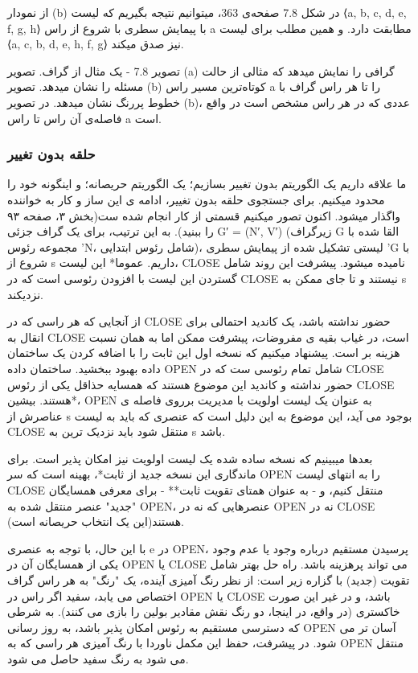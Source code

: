 \documentclass{book} %
\begin{document}
از نمودار (b) در شکل 7.8 صفحه‌ی 363، میتوانیم نتیجه بگیریم که لیست ⟨a, b, c, d, e, f, g, h⟩ با پیمایش سطری با شروع از راس a مطابقت دارد. و همین مطلب برای لیست ⟨a, c, b, d, e, h, f, g⟩ نیز صدق میکند.

تصویر 7.8 - یک مثال از گراف. تصویر (a) گرافی را نمایش میدهد که مثالی از حالت مسئله را نشان میدهد.  تصویر (b) کوتاه‌ترین مسیر راس a را تا هر راس گراف با خطوط پررنگ نشان میدهد. در تصویر (b)، عددی که در هر راس مشخص است در واقع فاصله‌ی آن راس تا راس a است.

\newpage
\subsubsection*{حلقه بدون تغییر}

ما علاقه داریم یک الگوریتم بدون تغییر بسازیم؛ یک الگوریتم حریصانه؛ و اینگونه خود را محدود میکنیم. برای جستجوی حلقه بدون تغییر، ادامه ی این ساز و کار به خواننده واگذار میشود. اکنون تصور میکنیم قسمتی از کار انجام شده ست(بخش ۳، صفحه ۹۳ را ببنید). به این ترتیب، برای یک گراف جزئی G′ = (N′, V′) (زیرگراف G القا شده با مجموعه رئوس 'N، شامل رئوس ابتدایی)، لیستی تشکیل شده از پیمایش سطری 'G با شروع از s داریم.
عموما* این لیست، CLOSE نامیده میشود. پیشرفت این روند شامل گستردن این لیست با افزودن رئوسی است که در CLOSE نیستند و تا جای ممکن به s نزدیکند.


از آنجایی که هر راسی که در CLOSE حضور نداشته باشد، یک کاندید احتمالی برای انقال به CLOSE است، در غیاب بقیه ی مفروضات، پیشرفت ممکن اما به همان نسبت هزینه بر است.
پیشنهاد میکنیم که نسخه اول این ثابت را با اضافه کردن یک ساختمان داده بهبود ببخشید. ساختمان داده OPEN شامل تمام رئوسی ست که در CLOSE حضور نداشته و کاندید این موضوع هستند که همسایه حذاقل یکی از رئوس CLOSE هستند.
بیشین*، OPEN به عنوان یک لیست اولویت با مدیریت برروی فاصله ی عناصرش از ‌s بوجود می آید، این موضوع به این دلیل است که عنصری که باید به لیست CLOSE منتقل شود باید نزدیک ترین به s باشد.


بعدها میبینیم که نسخه ساده شده یک لیست اولویت نیز امکان پذیر است. برای ماندگاری این نسخه جدید از ثابت*، بهینه است که سر OPEN را به انتهای لیست CLOSE منتقل کنیم، و - به عنوان همتای تقویت ثابت** - برای معرفی همسایگان "جدید" عنصر منتقل شده به OPEN، عنصرهایی که نه در OPEN نه در CLOSE هستند(این یک انتخاب حریصانه است).

با این حال، با توجه به عنصری e در OPEN، پرسیدن مستقیم درباره وجود یا عدم وجود یکی از همسایگان آن در OPEN یا CLOSE می تواند پرهزینه باشد. راه حل بهتر شامل تقویت (جدید) با گزاره زیر است: از نظر رنگ آمیزی آینده، یک "رنگ" به هر راس گراف اختصاص می یابد، سفید اگر راس در OPEN یا CLOSE باشد، و در غیر این صورت خاکستری (در واقع، در اینجا، دو رنگ نقش مقادیر بولین را بازی می کنند). به شرطی که دسترسی مستقیم به رئوس امکان پذیر باشد، به روز رسانی OPEN آسان تر می شود. در پیشرفت، حفظ این مکمل ناوردا با رنگ آمیزی هر راسی که به OPEN منتقل می شود به رنگ سفید حاصل می شود.
\end{document}
